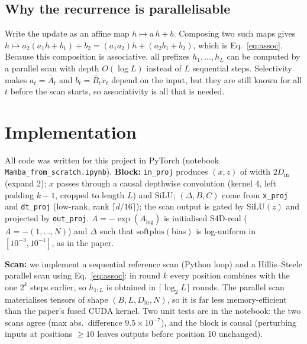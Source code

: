 \documentclass[10pt,twocolumn]{article}
\begin{document}
\subsection{Why the recurrence is parallelisable}
Write the update as an affine map $h\mapsto a\,h+b$. Composing two such maps gives $h\mapsto a_2(a_1h+b_1)+b_2=(a_1a_2)h+(a_2b_1+b_2)$, which is Eq.~\eqref{eq:assoc}. Because this composition is associative, all prefixes $h_1,\dots,h_L$ can be computed by a parallel scan with depth $O(\log L)$ instead of $L$ sequential steps. Selectivity makes $a_t=\bar A_t$ and $b_t=\bar B_tx_t$ depend on the input, but they are still known for all $t$ before the scan starts, so associativity is all that is needed.
\section{Implementation}
All code was written for this project in PyTorch (notebook \texttt{Mamba\_from\_scratch.ipynb}). \textbf{Block:} \texttt{in\_proj} produces $(x,z)$ of width $2D_{\text{in}}$ (expand 2); $x$ passes through a causal depthwise convolution (kernel 4, left padding $k{-}1$, cropped to length $L$) and SiLU; $(\Delta,B,C)$ come from \texttt{x\_proj} and \texttt{dt\_proj} (low-rank, rank $\lceil d/16\rceil$); the scan output is gated by $\mathrm{SiLU}(z)$ and projected by \texttt{out\_proj}. $A=-\exp(A_{\log})$ is initialised S4D-real ($A=-(1,\dots,N)$) and $\Delta$ such that $\mathrm{softplus}(\text{bias})$ is log-uniform in $[10^{-3},10^{-1}]$, as in the paper.

\textbf{Scan:} we implement a sequential reference scan (Python loop) and a Hillis--Steele parallel scan using Eq.~\eqref{eq:assoc}: in round $k$ every position combines with the one $2^k$ steps earlier, so $h_{1:L}$ is obtained in $\lceil\log_2L\rceil$ rounds. The parallel scan materialises tensors of shape $(B,L,D_{\text{in}},N)$, so it is far less memory-efficient than the paper's fused CUDA kernel. Two unit tests are in the notebook: the two scans agree (max abs.\ difference $9.5{\times}10^{-7}$), and the block is causal (perturbing inputs at positions $\ge10$ leaves outputs before position 10 unchanged).
\end{document}
